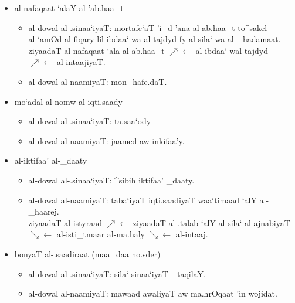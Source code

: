 \begin{itemize}
    \item al-nafaqaat `alaY al-'ab.haa_t
    \begin{itemize}
        \item al-dowal al-.sinaa`iyaT: mortafe`aT 'i_d 'ana al-ab.haa_t
            to^sakel al-`amOd al-fiqary lil-ibdaa` wa-al-tajdyd fy al-sila`
            wa-al-_hadamaat.\\
            ziyaadaT al-nafaqaat `ala al-ab.haa_t
            $\nearrow\leftarrow$ al-ibdaa` wal-tajdyd
            $\nearrow\leftarrow$ al-intaajiyaT.
        \item al-dowal al-naamiyaT: mon_hafe.daT.
    \end{itemize}
\end{itemize}
\begin{itemize}
    \item mo`adal al-nomw al-iqti.saady
    \begin{itemize}
        \item al-dowal al-.sinaa`iyaT: ta.saa`ody
        \item al-dowal al-naamiyaT: jaamed aw inkifaa'y.
    \end{itemize}
\end{itemize}
\begin{itemize}
    \item al-iktifaa' al-_daaty
    \begin{itemize}
        \item al-dowal al-.sinaa`iyaT: ^sibih iktifaa' _daaty.
        \item al-dowal al-naamiyaT: taba`iyaT iqti.saadiyaT waa`timaad `alY
            al-_haarej.\\
            ziyaadaT al-istyraad
            $\nearrow\leftarrow$ ziyaadaT al-.talab `alY al-sila` al-ajnabiyaT
            $\searrow\leftarrow$ al-isti_tmaar al-ma.haly
            $\searrow\leftarrow$ al-intaaj.
    \end{itemize}
\end{itemize}
\begin{itemize}
    \item bonyaT al-.saadiraat (maa_daa no.sder)
    \begin{itemize}
        \item al-dowal al-.sinaa`iyaT: sila` sinaa`iyaT _taqilaY.
        \item al-dowal al-naamiyaT: mawaad awaliyaT aw ma.hrOqaat 'in wojidat.
    \end{itemize}
\end{itemize}
